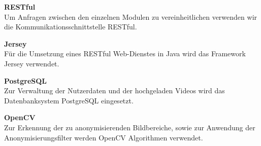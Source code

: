 \begin{description}
\item \textbf{RESTful} \hfill \\
Um Anfragen zwischen den einzelnen Modulen zu vereinheitlichen verwenden wir die Kommunikationsschnittstelle RESTful.

\item \textbf{Jersey} \hfill \\
Für die Umsetzung eines RESTful \gls{Web-Dienst}es in Java wird das Framework Jersey verwendet.

\item \textbf{PostgreSQL} \hfill \\
Zur Verwaltung der Nutzerdaten und der hochgeladen Videos wird das Datenbanksystem PostgreSQL eingesetzt.

\item \textbf{OpenCV} \hfill \\
Zur Erkennung der zu anonymisierenden Bildbereiche, sowie zur Anwendung der Anonymisierungsfilter werden OpenCV Algorithmen verwendet.

\end{description}